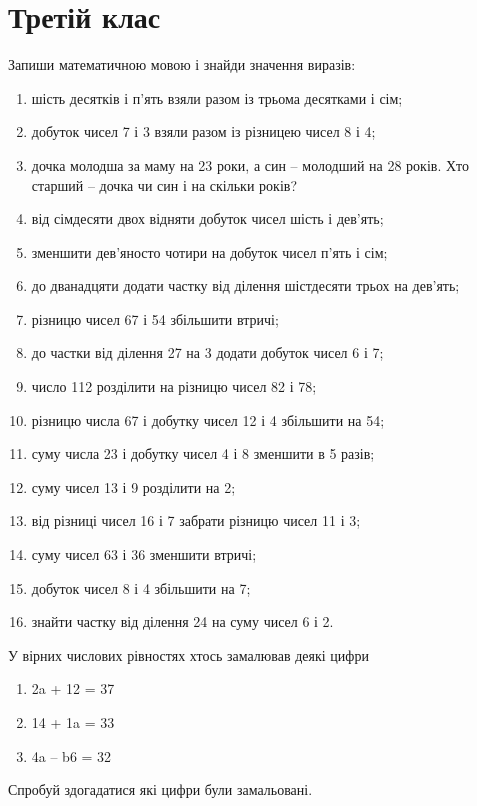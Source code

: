 \chapter{Третій клас}

\problem
Запиши математичною мовою і знайди значення виразів:
\begin{enumerate}
    \item шість десятків і п'ять взяли разом із трьома десятками і сім;
    \item добуток чисел 7 і 3 взяли разом із різницею чисел 8 і 4;
    \item дочка молодша за маму на 23 роки, а син – молодший на 28 років.
    Хто старший – дочка чи син і на скільки років?
    \item від сімдесяти двох відняти добуток чисел шість і дев'ять;
    \item зменшити дев'яносто чотири на добуток чисел п'ять і сім;
    \item до дванадцяти додати частку від ділення шістдесяти трьох на дев'ять;
    \item різницю чисел 67 і 54 збільшити втричі;
    \item до частки від ділення 27 на 3 додати добуток чисел 6 і 7;
    \item число 112 розділити на різницю чисел 82 і 78;
    \item різницю числа 67 і добутку чисел 12 і 4 збільшити на 54;
    \item суму числа 23 і добутку чисел 4 і 8 зменшити в 5 разів;
    \item суму чисел 13 і 9 розділити на 2;
    \item від різниці чисел 16 і 7 забрати різницю чисел 11 і 3;
    \item суму чисел 63 і 36 зменшити втричі;
    \item добуток чисел 8 і 4 збільшити на 7;
    \item знайти частку від ділення 24 на суму чисел 6 і 2.
\end{enumerate}


\problem
У вірних числових рівностях хтось замалював деякі цифри
\begin{multicols}{2}
    \begin{enumerate}
        \item 2a + 12 = 37
        \item 14 + 1a = 33
        \item 4a – b6 = 32
    \end{enumerate}
\end{multicols}
Спробуй здогадатися які цифри були замальовані.


